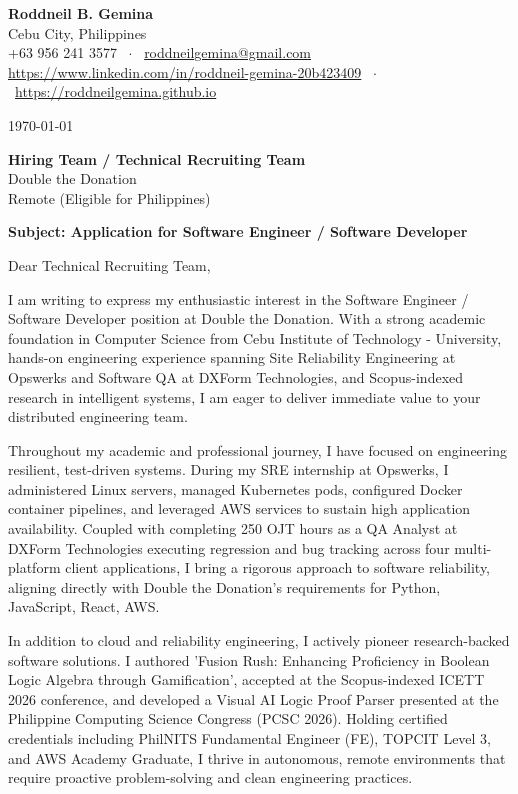 \documentclass[letterpaper,11pt]{article}
\begin{document}
\textbf{Roddneil B. Gemina} \\
Cebu City, Philippines \\
+63 956 241 3577 \ $\cdot$ \ \href{mailto:roddneilgemina@gmail.com}{roddneilgemina@gmail.com} \\
\href{https://www.linkedin.com/in/roddneil-gemina-20b423409}{https://www.linkedin.com/in/roddneil-gemina-20b423409} \ $\cdot$ \ \href{https://roddneilgemina.github.io}{https://roddneilgemina.github.io}

\vspace{12pt}
\today

\vspace{8pt}
\textbf{Hiring Team / Technical Recruiting Team} \\
Double the Donation \\
Remote (Eligible for Philippines)

\vspace{8pt}
\textbf{Subject: Application for Software Engineer / Software Developer}

\vspace{4pt}
Dear Technical Recruiting Team,

I am writing to express my enthusiastic interest in the Software Engineer / Software Developer position at Double the Donation. With a strong academic foundation in Computer Science from Cebu Institute of Technology - University, hands-on engineering experience spanning Site Reliability Engineering at Opswerks and Software QA at DXForm Technologies, and Scopus-indexed research in intelligent systems, I am eager to deliver immediate value to your distributed engineering team.

Throughout my academic and professional journey, I have focused on engineering resilient, test-driven systems. During my SRE internship at Opswerks, I administered Linux servers, managed Kubernetes pods, configured Docker container pipelines, and leveraged AWS services to sustain high application availability. Coupled with completing 250 OJT hours as a QA Analyst at DXForm Technologies executing regression and bug tracking across four multi-platform client applications, I bring a rigorous approach to software reliability, aligning directly with Double the Donation's requirements for Python, JavaScript, React, AWS.

In addition to cloud and reliability engineering, I actively pioneer research-backed software solutions. I authored 'Fusion Rush: Enhancing Proficiency in Boolean Logic Algebra through Gamification', accepted at the Scopus-indexed ICETT 2026 conference, and developed a Visual AI Logic Proof Parser presented at the Philippine Computing Science Congress (PCSC 2026). Holding certified credentials including PhilNITS Fundamental Engineer (FE), TOPCIT Level 3, and AWS Academy Graduate, I thrive in autonomous, remote environments that require proactive problem-solving and clean engineering practices.
\end{document}
